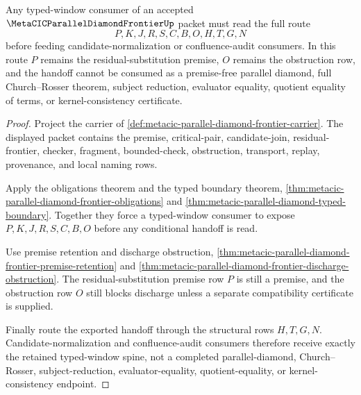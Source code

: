 \begin{theorem}
\label{thm:metacic-parallel-diamond-frontier-typed-window-handoff}
Any typed-window consumer of an accepted $\MetaCICParallelDiamondFrontierUp$ packet must read the full route
$$
P,K,J,R,S,C,B,O,H,T,G,N
$$
before feeding candidate-normalization or confluence-audit consumers. In this route $P$ remains the residual-substitution premise, $O$ remains the obstruction row, and the handoff cannot be consumed as a premise-free parallel diamond, full Church--Rosser theorem, subject reduction, evaluator equality, quotient equality of terms, or kernel-consistency certificate.
\end{theorem}
\begin{proof}
Project the carrier of \autoref{def:metacic-parallel-diamond-frontier-carrier}. The displayed packet contains the premise, critical-pair, candidate-join, residual-frontier, checker, fragment, bounded-check, obstruction, transport, replay, provenance, and local naming rows.

Apply the obligations theorem and the typed boundary theorem, \autoref{thm:metacic-parallel-diamond-frontier-obligations} and \autoref{thm:metacic-parallel-diamond-typed-boundary}. Together they force a typed-window consumer to expose $P,K,J,R,S,C,B,O$ before any conditional handoff is read.

Use premise retention and discharge obstruction, \autoref{thm:metacic-parallel-diamond-frontier-premise-retention} and \autoref{thm:metacic-parallel-diamond-frontier-discharge-obstruction}. The residual-substitution premise row $P$ is still a premise, and the obstruction row $O$ still blocks discharge unless a separate compatibility certificate is supplied.

Finally route the exported handoff through the structural rows $H,T,G,N$. Candidate-normalization and confluence-audit consumers therefore receive exactly the retained typed-window spine, not a completed parallel-diamond, Church--Rosser, subject-reduction, evaluator-equality, quotient-equality, or kernel-consistency endpoint.
\end{proof}

